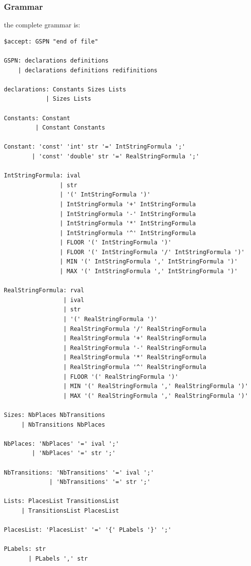 \documentclass{article}
\begin{document}
\subsubsection{Grammar}
the complete grammar is:
\begin{verbatim}
$accept: GSPN "end of file"

GSPN: declarations definitions
    | declarations definitions redifinitions

declarations: Constants Sizes Lists
            | Sizes Lists

Constants: Constant
         | Constant Constants

Constant: 'const' 'int' str '=' IntStringFormula ';'
        | 'const' 'double' str '=' RealStringFormula ';'

IntStringFormula: ival
                | str
                | '(' IntStringFormula ')'
                | IntStringFormula '+' IntStringFormula
                | IntStringFormula '-' IntStringFormula
                | IntStringFormula '*' IntStringFormula
                | IntStringFormula '^' IntStringFormula
                | FLOOR '(' IntStringFormula ')'
                | FLOOR '(' IntStringFormula '/' IntStringFormula ')'
                | MIN '(' IntStringFormula ',' IntStringFormula ')'
                | MAX '(' IntStringFormula ',' IntStringFormula ')'

RealStringFormula: rval
                 | ival
                 | str
                 | '(' RealStringFormula ')'
                 | RealStringFormula '/' RealStringFormula
                 | RealStringFormula '+' RealStringFormula
                 | RealStringFormula '-' RealStringFormula
                 | RealStringFormula '*' RealStringFormula
                 | RealStringFormula '^' RealStringFormula
                 | FLOOR '(' RealStringFormula ')'
                 | MIN '(' RealStringFormula ',' RealStringFormula ')'
                 | MAX '(' RealStringFormula ',' RealStringFormula ')'

Sizes: NbPlaces NbTransitions
     | NbTransitions NbPlaces

NbPlaces: 'NbPlaces' '=' ival ';'
        | 'NbPlaces' '=' str ';'

NbTransitions: 'NbTransitions' '=' ival ';'
             | 'NbTransitions' '=' str ';'

Lists: PlacesList TransitionsList
     | TransitionsList PlacesList

PlacesList: 'PlacesList' '=' '{' PLabels '}' ';'

PLabels: str
       | PLabels ',' str


\end{verbatim}
\end{document}
